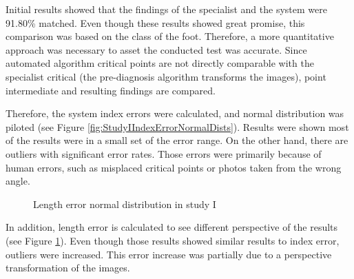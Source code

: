 Initial results showed that the findings of the specialist and the system were 91.80\% matched. Even though these results showed great promise, this comparison was based on the class of the foot. Therefore, a more quantitative approach was necessary to asset the conducted test was accurate. Since automated algorithm critical points are not directly comparable with the specialist critical (the pre-diagnosis algorithm transforms the images), point intermediate and resulting findings are compared.

Therefore, the system index errors were calculated, and normal distribution was piloted (see Figure \ref{fig:StudyIIndexErrorNormalDists}). Results were shown most of the results were in a small set of the error range. On the other hand, there are outliers with significant error rates. Those errors were primarily because of human errors, such as misplaced critical points or photos taken from the wrong angle. 

\begin{figure}[htbp]
\centering
{}
\caption{Length error normal distribution in study I}
\label{fig:StudyILenghtErrorNormalDists}
\end{figure}

In addition, length error is calculated to see different perspective of the results (see Figure \ref{fig:StudyILenghtErrorNormalDists}). Even though those results showed similar results to index error, outliers were increased. This error increase was partially due to a perspective transformation of the images.